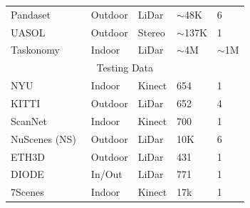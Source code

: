 \begin{table}[]
\begin{threeparttable}
{\begin{tabular}{ r llll}
\multicolumn{1}{l|}{Pandaset~\cite{itsc21pandaset}}                       & \multicolumn{1}{l|}{Outdoor}        & \multicolumn{1}{l|}{LiDar}                 & \multicolumn{1}{l|}{$\sim$48K}         & 6              \\
\multicolumn{1}{l|}{UASOL~\cite{bauer2019uasol}}                          & \multicolumn{1}{l|}{Outdoor}        & \multicolumn{1}{l|}{Stereo\tnote{\dag}}       & \multicolumn{1}{l|}{$\sim$137K}        & 1              \\
\multicolumn{1}{l|}{Taskonomy~\cite{zamir2018taskonomy}}                      & \multicolumn{1}{l|}{Indoor}         & \multicolumn{1}{l|}{LiDar}                 & \multicolumn{1}{l|}{$\sim$4M}       & $\sim$1M            \\ \hline
\multicolumn{5}{c}{Testing Data}                                                                                                                                                           \\ \hline
\multicolumn{1}{l|}{NYU~\cite{silberman2012indoor}}                            & \multicolumn{1}{l|}{Indoor}         & \multicolumn{1}{l|}{Kinect}                & \multicolumn{1}{l|}{654}         & 1              \\
\multicolumn{1}{l|}{KITTI~\cite{Geiger2013IJRR}}                          & \multicolumn{1}{l|}{Outdoor}        & \multicolumn{1}{l|}{LiDar}                 & \multicolumn{1}{l|}{652}           & 4         \\
\multicolumn{1}{l|}{ScanNet~\cite{dai2017scannet}}                        & \multicolumn{1}{l|}{Indoor}         & \multicolumn{1}{l|}{Kinect}                & \multicolumn{1}{l|}{700}         & 1              \\
\multicolumn{1}{l|}{NuScenes (NS)~\cite{caesar2020nuscenes}}                       & \multicolumn{1}{l|}{Outdoor}        & \multicolumn{1}{l|}{LiDar}                 & \multicolumn{1}{l|}{10K}           & 6              \\
\multicolumn{1}{l|}{ETH3D~\cite{schops2017multi}}                          & \multicolumn{1}{l|}{Outdoor}        & \multicolumn{1}{l|}{LiDar}                 & \multicolumn{1}{l|}{431}           & 1              \\
\multicolumn{1}{l|}{DIODE~\cite{vasiljevic2019diode}}                          & \multicolumn{1}{l|}{In/Out} & \multicolumn{1}{l|}{LiDar}                 & \multicolumn{1}{l|}{771}           & 1           \\
\multicolumn{1}{l|}{7Scenes~\cite{shotton2013scene}}                        & \multicolumn{1}{l|}{Indoor}         & \multicolumn{1}{l|}{Kinect}                & \multicolumn{1}{l|}{17k}           & 1              \\

\end{tabular}}
\end{threeparttable}
\end{table}
